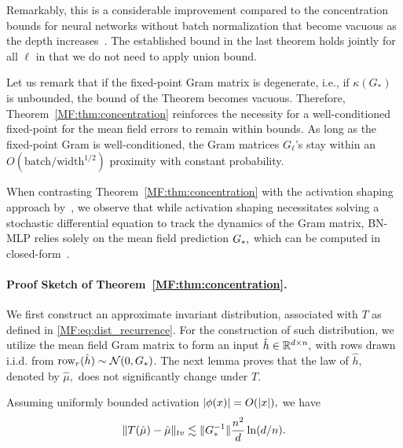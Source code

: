 Remarkably, this is a considerable improvement compared to the concentration bounds for neural networks without batch normalization that become vacuous  as the depth increases~\cite{hanin2019finite,hanin2022correlation}. The established bound in the last theorem holds jointly for all $\ell$ in that we do not need to apply union bound. 


Let us remark that if the fixed-point Gram matrix is degenerate, i.e., if $\kappa(G_*)$ is unbounded, the bound of the Theorem becomes vacuous. Therefore, Theorem~\ref{MF:thm:concentration} reinforces the necessity for a well-conditioned fixed-point for the mean field errors to remain within bounds. As long as the fixed-point Gram is well-conditioned, the Gram matrices $G_\ell$'s stay within an $O(\text{batch}/\text{width}^{1/2})$ proximity with constant probability.

When contrasting Theorem~\ref{MF:thm:concentration} with the activation shaping approach by~\citet{li2022neural}, we observe that while activation shaping necessitates solving a stochastic differential equation to track the dynamics of the Gram matrix, BN-MLP relies solely on the mean field prediction ${G_*},$ which can be computed in closed-form~\citet{yang2018a}.


\paragraph{Proof Sketch of Theorem~\ref{MF:thm:concentration}.}
We first construct an approximate invariant distribution, associated with $T$ as defined in \eqref{MF:eq:dist_recurrence}. For the construction of such distribution, we utilize the mean field Gram matrix to form an input $\hat h\in\mathbb{R}^{d\times n},$ with rows drawn i.i.d. from ${\mathrm{row}}_r(\hat h)\sim \mathcal{N}(0,{G_*})$. The next lemma proves that the law of $\hat h,$ denoted by $\hat \mu,$ does not significantly change under $T.$

\begin{lemma}\label{MF:lem:tv_one_step}
Assuming uniformly bounded activation ${|\phi(x)| = O(|x|)},$ we have
\begin{align}
\| T(\hat \mu)- \hat \mu \|_{tv}\lesssim \lVert G_*^{-1}\rVert \frac{n^2}{d}\ln(d/n).
\end{align}
\end{lemma}

